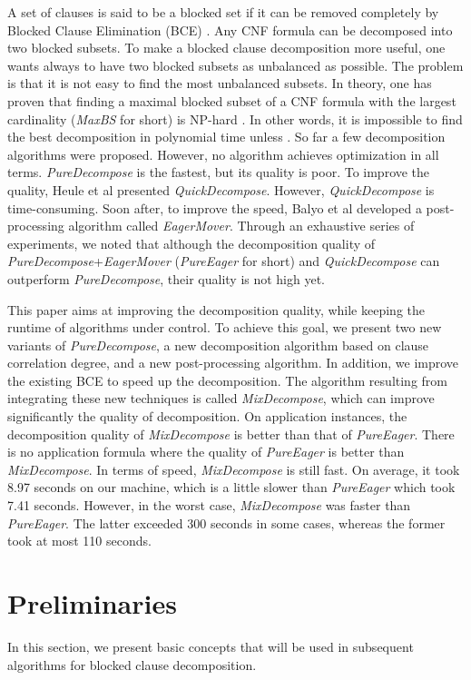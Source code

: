 \documentclass{llncs}
\begin{document}
 A set of clauses is said to be a blocked set if it can be removed
 completely by Blocked Clause Elimination (BCE) \cite{BCE:99,BCE:12}.
 Any CNF formula can be decomposed into two blocked subsets.
To make a blocked clause decomposition more useful, one wants always
to have two blocked subsets as unbalanced as possible. The problem
is that it is not easy to find the most unbalanced subsets. In
theory, one has proven that finding a maximal blocked subset of a
CNF formula with the largest cardinality (\emph{MaxBS} for short) is
NP-hard \cite{sbliter:13}. In other words, it is impossible to find
the best decomposition in polynomial time unless . So far a
few decomposition algorithms were proposed. However, no algorithm
achieves optimization in all terms. \emph{PureDecompose} \cite
{sbliter:13} is the fastest, but its quality is poor. To improve the
quality, Heule et al \cite{sbliter:13} presented
\emph{QuickDecompose}. However, \emph{QuickDecompose} is
time-consuming. Soon after, to improve the speed, Balyo et al
\cite{EagerMover:14} developed a post-processing algorithm called
\emph{EagerMover}. Through an exhaustive series of experiments, we
noted that although the decomposition quality of
\emph{PureDecompose}+\emph{EagerMover} (\emph{PureEager} for short)
and \emph{QuickDecompose} can outperform \emph{PureDecompose}, their
quality is not high yet.

   This paper aims at improving the decomposition quality, while
keeping the runtime of algorithms under control. To achieve this
goal, we present two new variants of \emph{PureDecompose},
 a new decomposition algorithm based
 on clause correlation degree, and a new post-processing algorithm.
 In addition, we improve the existing BCE to speed up the
 decomposition. The algorithm resulting from integrating these new techniques is called
 \emph{MixDecompose}, which can improve significantly the quality of
 decomposition. On application instances,
 the decomposition quality of \emph{MixDecompose} is better than that of \emph{PureEager}.
There is no application formula where the quality of
\emph{PureEager} is better than \emph{MixDecompose}. In terms of
speed, \emph{MixDecompose} is still fast. On average, it took 8.97
seconds on our machine, which is a little slower than
\emph{PureEager} which took 7.41 seconds. However, in the worst case,
\emph{MixDecompose} was faster than \emph{PureEager}. The latter
exceeded 300 seconds in some cases, whereas the former took at most
110 seconds.


\section{Preliminaries}
In this section, we present basic concepts that will be used in
subsequent algorithms for blocked clause decomposition.
\end{document}
